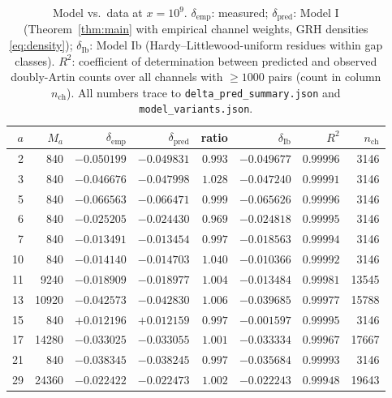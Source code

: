 \documentclass[11pt,reqno]{amsart}
\theoremstyle{plain}
\theoremstyle{definition}
\begin{document}
\begin{table}[ht]
\centering
\caption{Model vs.\ data at $x = 10^9$. $\delta_{\mathrm{emp}}$: measured;
$\delta_{\mathrm{pred}}$: Model I (Theorem~\ref{thm:main} with empirical
channel weights, GRH densities \eqref{eq:density});
$\delta_{\mathrm{Ib}}$: Model Ib (Hardy--Littlewood-uniform residues within
gap classes). $R^2$: coefficient of determination between predicted and
observed doubly-Artin counts over all channels with $\ge 1000$ pairs
(count in column $n_{\mathrm{ch}}$). All numbers trace to
\texttt{delta\_pred\_summary.json} and \texttt{model\_variants.json}.}
\label{tab:main}
\small
\begin{tabular}{r r r r r r r r}
\toprule
$a$ & $M_a$ & $\delta_{\mathrm{emp}}$ & $\delta_{\mathrm{pred}}$ &
ratio & $\delta_{\mathrm{Ib}}$ & $R^2$ & $n_{\mathrm{ch}}$ \\
\midrule
 2 &   840 & $-0.050199$ & $-0.049831$ & $0.993$ & $-0.049677$ & $0.99996$ & 3146 \\
 3 &   840 & $-0.046676$ & $-0.047998$ & $1.028$ & $-0.047240$ & $0.99991$ & 3146 \\
 5 &   840 & $-0.066563$ & $-0.066471$ & $0.999$ & $-0.065626$ & $0.99996$ & 3146 \\
 6 &   840 & $-0.025205$ & $-0.024430$ & $0.969$ & $-0.024818$ & $0.99995$ & 3146 \\
 7 &   840 & $-0.013491$ & $-0.013454$ & $0.997$ & $-0.018563$ & $0.99994$ & 3146 \\
10 &   840 & $-0.014140$ & $-0.014703$ & $1.040$ & $-0.010366$ & $0.99992$ & 3146 \\
11 &  9240 & $-0.018909$ & $-0.018977$ & $1.004$ & $-0.013484$ & $0.99981$ & 13545 \\
13 & 10920 & $-0.042573$ & $-0.042830$ & $1.006$ & $-0.039685$ & $0.99977$ & 15788 \\
15 &   840 & $+0.012196$ & $+0.012159$ & $0.997$ & $-0.001597$ & $0.99995$ & 3146 \\
17 & 14280 & $-0.033025$ & $-0.033055$ & $1.001$ & $-0.033334$ & $0.99967$ & 17667 \\
21 &   840 & $-0.038345$ & $-0.038245$ & $0.997$ & $-0.035684$ & $0.99993$ & 3146 \\
29 & 24360 & $-0.022422$ & $-0.022473$ & $1.002$ & $-0.022243$ & $0.99948$ & 19643 \\
\bottomrule
\end{tabular}
\end{table}
\end{document}
